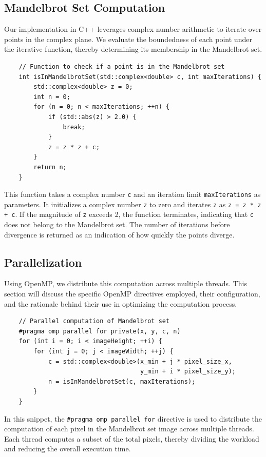 \documentclass[11pt]{article}
\begin{document}
\subsection{Mandelbrot Set Computation}
Our implementation in C++ leverages complex number arithmetic to iterate over points in the complex plane. We evaluate the boundedness of each point under the iterative function, thereby determining its membership in the Mandelbrot set.
\begin{verbatim}
    // Function to check if a point is in the Mandelbrot set
    int isInMandelbrotSet(std::complex<double> c, int maxIterations) {
        std::complex<double> z = 0;
        int n = 0;
        for (n = 0; n < maxIterations; ++n) {
            if (std::abs(z) > 2.0) {
                break;
            }
            z = z * z + c;
        }
        return n;
    }
\end{verbatim}

    This function takes a complex number \texttt{c} and an iteration limit \texttt{maxIterations} as parameters. It initializes a complex number \texttt{z} to zero and iterates \texttt{z} as \texttt{z = z * z + c}. If the magnitude of \texttt{z} exceeds 2, the function terminates, indicating that \texttt{c} does not belong to the Mandelbrot set. The number of iterations before divergence is returned as an indication of how quickly the points diverge.

    \subsection{Parallelization}
Using OpenMP, we distribute this computation across multiple threads. This section will discuss the specific OpenMP directives employed, their configuration, and the rationale behind their use in optimizing the computation process.

\begin{verbatim}
    // Parallel computation of Mandelbrot set
    #pragma omp parallel for private(x, y, c, n)
    for (int i = 0; i < imageHeight; ++i) {
        for (int j = 0; j < imageWidth; ++j) {
            c = std::complex<double>(x_min + j * pixel_size_x,
                                     y_min + i * pixel_size_y);
            n = isInMandelbrotSet(c, maxIterations);
        }
    }
\end{verbatim}
    In this snippet, the \texttt{\#pragma omp parallel for} directive is used to distribute the computation of each pixel in the Mandelbrot set image across multiple threads. Each thread computes a subset of the total pixels, thereby dividing the workload and reducing the overall execution time.
\end{document}
